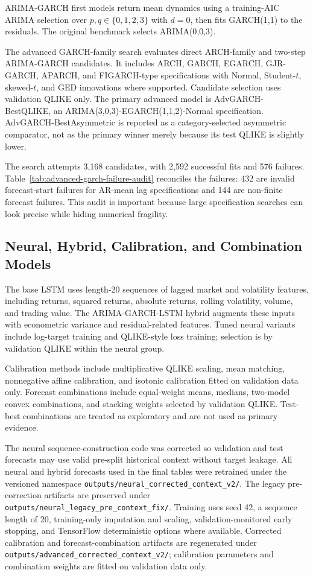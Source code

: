 ARIMA-GARCH first models return mean dynamics using a training-AIC ARIMA selection over \(p,q\in\{0,1,2,3\}\) with \(d=0\), then fits GARCH(1,1) to the residuals. The original benchmark selects ARIMA(0,0,3).

The advanced GARCH-family search evaluates direct ARCH-family and two-step ARIMA-GARCH candidates. It includes ARCH, GARCH, EGARCH, GJR-GARCH, APARCH, and FIGARCH-type specifications with Normal, Student-\(t\), skewed-\(t\), and GED innovations where supported. Candidate selection uses validation QLIKE only. The primary advanced model is AdvGARCH-BestQLIKE, an ARIMA(3,0,3)-EGARCH(1,1,2)-Normal specification. AdvGARCH-BestAsymmetric is reported as a category-selected asymmetric comparator, not as the primary winner merely because its test QLIKE is slightly lower.



The search attempts 3,168 candidates, with 2,592 successful fits and 576 failures. Table~\ref{tab:advanced-garch-failure-audit} reconciles the failures: 432 are invalid forecast-start failures for AR-mean lag specifications and 144 are non-finite forecast failures. This audit is important because large specification searches can look precise while hiding numerical fragility.

\subsection{Neural, Hybrid, Calibration, and Combination Models}

The base LSTM uses length-20 sequences of lagged market and volatility features, including returns, squared returns, absolute returns, rolling volatility, volume, and trading value. The ARIMA-GARCH-LSTM hybrid augments these inputs with econometric variance and residual-related features. Tuned neural variants include log-target training and QLIKE-style loss training; selection is by validation QLIKE within the neural group.

Calibration methods include multiplicative QLIKE scaling, mean matching, nonnegative affine calibration, and isotonic calibration fitted on validation data only. Forecast combinations include equal-weight means, medians, two-model convex combinations, and stacking weights selected by validation QLIKE. Test-best combinations are treated as exploratory and are not used as primary evidence.

The neural sequence-construction code was corrected so validation and test forecasts may use valid pre-split historical context without target leakage. All neural and hybrid forecasts used in the final tables were retrained under the versioned namespace \texttt{outputs/neural\_corrected\_context\_v2/}. The legacy pre-correction artifacts are preserved under \texttt{outputs/neural\_legacy\_pre\_context\_fix/}. Training uses seed 42, a sequence length of 20, training-only imputation and scaling, validation-monitored early stopping, and TensorFlow deterministic options where available. Corrected calibration and forecast-combination artifacts are regenerated under \texttt{outputs/advanced\_corrected\_context\_v2/}; calibration parameters and combination weights are fitted on validation data only.

